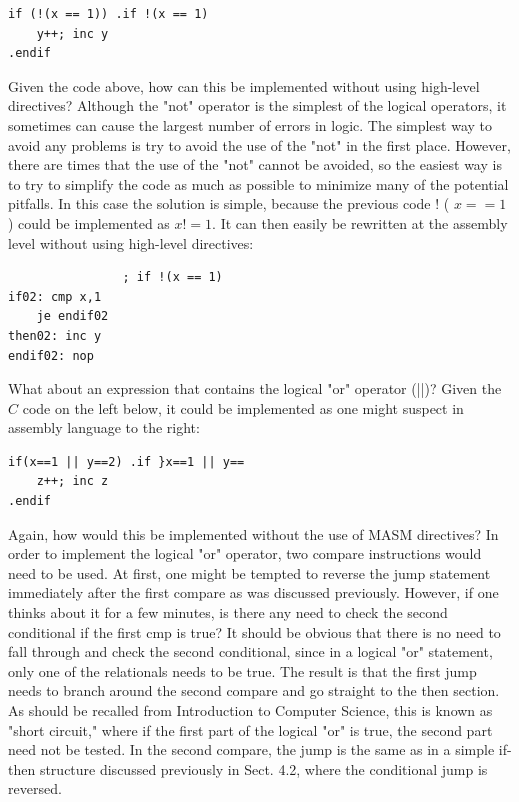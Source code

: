 \documentclass[10pt]{book}
\begin{document}
\begin{verbatim}
if (!(x == 1)) .if !(x == 1)
    y++; inc y
.endif
\end{verbatim}

Given the code above, how can this be implemented without using high-level directives? Although the "not" operator is the simplest of the logical operators, it sometimes can cause the largest number of errors in logic. The simplest way to avoid any problems is try to avoid the use of the "not" in the first place. However, there are times that the use of the "not" cannot be avoided, so the easiest way is to try to simplify the code as much as possible to minimize many of the potential pitfalls. In this case the solution is simple, because the previous code ! ( $x==1$ ) could be implemented as $x!=1$. It can then easily be rewritten at the assembly level without using high-level directives:

\begin{verbatim}
                ; if !(x == 1)
if02: cmp x,1
    je endif02
then02: inc y
endif02: nop
\end{verbatim}

What about an expression that contains the logical "or" operator (||)? Given the $C$ code on the left below, it could be implemented as one might suspect in assembly language to the right:

\begin{verbatim}
if(x==1 || y==2) .if }x==1 || y==
    z++; inc z
.endif
\end{verbatim}

Again, how would this be implemented without the use of MASM directives? In order to implement the logical "or" operator, two compare instructions would need to be used. At first, one might be tempted to reverse the jump statement immediately after the first compare as was discussed previously. However, if one thinks about it for a few minutes, is there any need to check the second conditional if the first cmp is true? It should be obvious that there is no need to fall through and check the second conditional, since in a logical "or" statement, only one of the relationals needs to be true. The result is that the first jump needs to branch around the second compare and go straight to the then section. As should be recalled from Introduction to Computer Science, this is known as "short circuit," where if the first part of the logical "or" is true, the second part need not be tested. In the second compare, the jump is the same as in a simple if-then structure discussed previously in Sect. 4.2, where the conditional jump is reversed.
\end{document}
